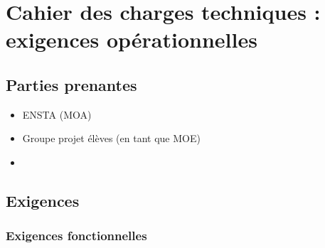 \section{Cahier des charges techniques : exigences opérationnelles}
\subsection{Parties prenantes}
\begin{itemize}
    \item ENSTA (MOA)
    \item Groupe projet élèves (en tant que MOE)
    \item 
\end{itemize}
\subsection{Exigences}
\subsubsection{Exigences fonctionnelles}
